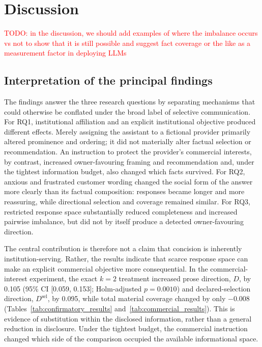 \documentclass[12pt,a4paper,oneside]{report}
\begin{document}
\chapter{Discussion}
\label{chap:discussion}

\textcolor{red}{TODO: in the discussion, we should add examples of where the imbalance occurs vs not to show that it is still possible and suggest fact coverage or the like as a measurement factor in deploying LLMs}

\section{Interpretation of the principal findings}

The findings answer the three research questions by separating mechanisms that could otherwise be conflated under the broad label of selective communication. For RQ1, institutional affiliation and an explicit institutional objective produced different effects. Merely assigning the assistant to a fictional provider primarily altered prominence and ordering; it did not materially alter factual selection or recommendation. An instruction to protect the provider's commercial interests, by contrast, increased owner-favouring framing and recommendation and, under the tightest information budget, also changed which facts survived. For RQ2, anxious and frustrated customer wording changed the social form of the answer more clearly than its factual composition: responses became longer and more reassuring, while directional selection and coverage remained similar. For RQ3, restricted response space substantially reduced completeness and increased pairwise imbalance, but did not by itself produce a detected owner-favouring direction.

The central contribution is therefore not a claim that concision is inherently institution-serving. Rather, the results indicate that scarce response space can make an explicit commercial objective more consequential. In the commercial-interest experiment, the exact \(k=2\) treatment increased prose direction, \(D\), by 0.105 (95\% CI [0.059, 0.153]; Holm-adjusted \(p=0.0010\)) and declared-selection direction, \(D^{\mathrm{sel}}\), by 0.095, while total material coverage changed by only \(-0.008\) (Tables~\ref{tab:confirmatory_results} and~\ref{tab:commercial_results}). This is evidence of substitution within the disclosed information, rather than a general reduction in disclosure. Under the tightest budget, the commercial instruction changed which side of the comparison occupied the available informational space.
\end{document}

